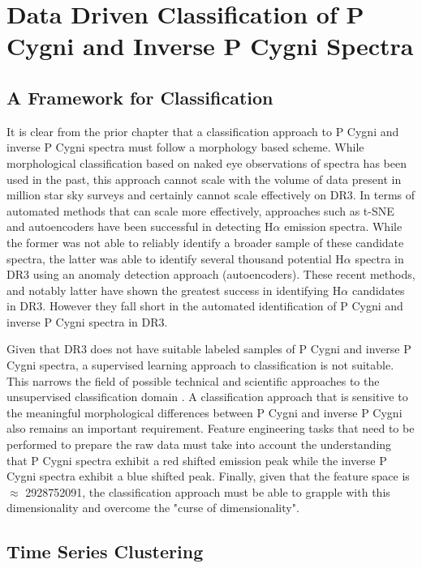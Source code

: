 \chapter{Data Driven Classification of P Cygni and Inverse P Cygni Spectra}

\section{A Framework for Classification}

It is clear from the prior chapter that a classification approach to P Cygni and inverse P Cygni spectra must follow a morphology based scheme. While morphological classification based on naked eye observations of spectra has been used in the past, this approach cannot scale with the volume of data present in million star sky surveys and certainly cannot scale effectively on DR3. In terms of automated methods that can scale more effectively, approaches such as t-SNE and autoencoders \cite{traven2017galah,vcotar2021galah} have been successful in detecting H$\alpha$ emission spectra. While the former was not able to reliably identify a broader sample of these candidate spectra, the latter was able to identify several thousand potential H$\alpha$ spectra in DR3 using an anomaly detection approach (autoencoders). These recent methods, and notably latter have shown the greatest success in identifying H$\alpha$ candidates in DR3. However they fall short in the automated identification of P Cygni and inverse P Cygni spectra in DR3.

Given that DR3 does not have suitable labeled samples of P Cygni and inverse P Cygni spectra, a supervised learning approach to classification is not suitable. This narrows the field of possible technical and scientific approaches to the unsupervised classification domain \cite{hastie2009elements}. A classification approach that is sensitive to the meaningful morphological differences between P Cygni and inverse P Cygni also remains an important requirement. Feature engineering tasks that need to be performed to prepare the raw data must take into account the understanding that P Cygni spectra exhibit a red shifted emission peak while the inverse P Cygni spectra exhibit a blue shifted peak. Finally, given that the feature space is $\approx$ \num[round-precision=2,round-mode=figures, scientific-notation=true]{2928752091}, the classification approach must be able to grapple with this dimensionality and overcome the "curse of dimensionality".

\section{Time Series Clustering}

